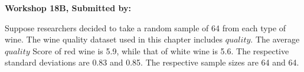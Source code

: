 \documentclass[11pt]{book}\usepackage[]{graphicx}\usepackage[]{color}
\begin{document}
\begin{exercises}
\begin{exercise}
\end{exercise}
\begin{solution}  %


\end{solution}

\clearpage

    \begin{exercise}  %



    \begin{center}
\begin{flushleft}\textbf{\large \hfill Workshop 18B, Submitted by: }\end{flushleft}

\end{center}

Suppose researchers decided to take a random sample of 64 from each type of wine.  The wine quality dataset used in this chapter includes $quality$. The average $quality$ Score of red wine is 5.9, while that of white wine is 5.6. The respective standard deviations are 0.83 and 0.85. The respective sample sizes are 64 and 64.


\end{exercise}
\end{exercises}
\end{document}

